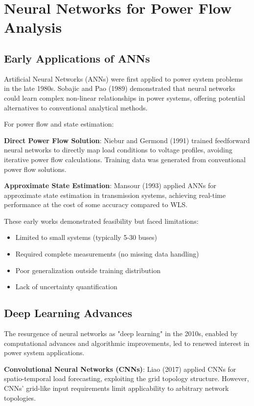\documentclass[12pt,a4paper]{report}
\begin{document}
\section{Neural Networks for Power Flow Analysis}

\subsection{Early Applications of ANNs}

Artificial Neural Networks (ANNs) were first applied to power system problems in the late 1980s. Sobajic and Pao (1989) demonstrated that neural networks could learn complex non-linear relationships in power systems, offering potential alternatives to conventional analytical methods.

For power flow and state estimation:

\textbf{Direct Power Flow Solution}: Niebur and Germond (1991) trained feedforward neural networks to directly map load conditions to voltage profiles, avoiding iterative power flow calculations. Training data was generated from conventional power flow solutions.

\textbf{Approximate State Estimation}: Mansour (1993) applied ANNs for approximate state estimation in transmission systems, achieving real-time performance at the cost of some accuracy compared to WLS.

These early works demonstrated feasibility but faced limitations:
\begin{itemize}
    \item Limited to small systems (typically 5-30 buses)
    \item Required complete measurements (no missing data handling)
    \item Poor generalization outside training distribution
    \item Lack of uncertainty quantification
\end{itemize}

\subsection{Deep Learning Advances}

The resurgence of neural networks as "deep learning" in the 2010s, enabled by computational advances and algorithmic improvements, led to renewed interest in power system applications.

\textbf{Convolutional Neural Networks (CNNs)}: Liao (2017) applied CNNs for spatio-temporal load forecasting, exploiting the grid topology structure. However, CNNs' grid-like input requirements limit applicability to arbitrary network topologies.
\end{document}
